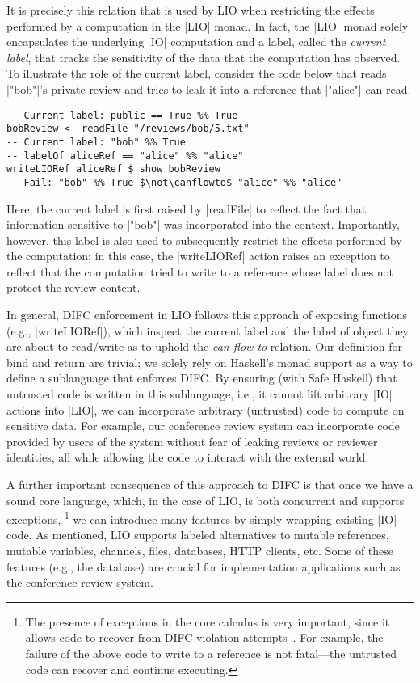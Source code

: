 It is precisely this relation that is used by LIO when restricting the
effects performed by a computation in the \hs|LIO| monad.
%
In fact, the \hs|LIO| monad solely encapsulates the underlying
\hs|IO| computation and a label, called the \emph{current label}, that
tracks the sensitivity of the data that the computation has observed.
%
To illustrate the role of the current label, consider the code below
that reads \hs|"bob"|'s private review and tries to leak it into a
reference that \hs|"alice"| can read.
\begin{verbatim}
-- Current label: public == True %% True
bobReview <- readFile "/reviews/bob/5.txt"
-- Current label: "bob" %% True
-- labelOf aliceRef == "alice" %% "alice"
writeLIORef aliceRef $ show bobReview
-- Fail: "bob" %% True $\not\canflowto$ "alice" %% "alice"
\end{verbatim}
%
Here, the current label is first raised by \hs|readFile| to reflect
the fact that information sensitive to \hs|"bob"| was incorporated
into the context.
%
Importantly, however, this label is also used to subsequently restrict
the effects performed by the computation; in this case, the
\hs|writeLIORef| action raises an exception to reflect that
the computation tried to write to a reference whose label
does not protect the review content.

In general, DIFC enforcement in LIO follows this approach of exposing
functions (e.g., \hs|writeLIORef|), which inspect the current label
and the label of object they are about to read/write as to uphold the
\emph{can flow to} relation. Our definition for bind and return are
trivial;
%
we solely rely on Haskell's monad support as a way to define a
sublanguage that enforces DIFC.
%
By ensuring (with Safe Haskell) that untrusted code is written in
this sublanguage, i.e., it cannot lift arbitrary \hs|IO| actions into
\hs|LIO|, we can incorporate arbitrary (untrusted) code to compute on
sensitive data.
%
For example, our conference review system can incorporate code
provided by users of the system without fear of leaking reviews or
reviewer identities, all while allowing the code to interact with the
external world.

A further important consequence of this approach to DIFC is that once
we have a sound core language, which, in the case of LIO, is both
concurrent and supports exceptions,
\footnote{
  The presence of exceptions in the core calculus is very important,
  since it allows code to recover from DIFC violation
  attempts~\cite{Breeze, stefan:2012:arxiv-flexible}.
  For example, the failure of the above code to write to a reference
  is not fatal---the untrusted code can recover and continue
  executing.
}
we can introduce many features by simply wrapping existing \hs|IO|
code.
%
As mentioned, LIO supports labeled alternatives to mutable references,
mutable variables, channels, files, databases, HTTP clients, etc.
%
Some of these features (e.g., the database) are crucial for
implementation applications such as the conference review system.

